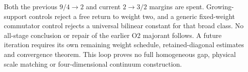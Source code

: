 Both the previous $9/4\to2$ and current $2\to3/2$ margins are spent. Growing-support controls reject a free return to weight two, and a generic fixed-weight commutator control rejects a universal bilinear constant for that broad class. No all-stage conclusion or repair of the earlier O2 majorant follows. A future iteration requires its own remaining weight schedule, retained-diagonal estimates and convergence theorem. This loop proves no full homogeneous gap, physical scale matching or four-dimensional continuum construction.
